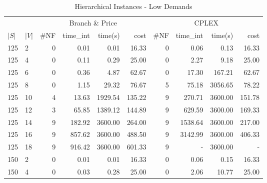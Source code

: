 \begin{appendices}
\begin{table*}
\scriptsize
\begin{center}
\caption{Hierarchical Instances - Low Demands}
\begin{tabular} {l l | r r r r | r r r r}
\hline
       &                                 &  \multicolumn{4}{c|}{Branch \& Price}                                & \multicolumn{4}{c}{CPLEX}                 \\
 $|S|$ & $|V|$                           &  \#NF  & time\_int     &  time(s)      &  cost            &  \#NF   &  time\_int   &  time(s)       &  cost       \\ 
\hline
125 & 2   &  0            &  0.01          &  0.01        &  16.33     &  0           &  0.06            &  0.13       &  16.33     \\ 
125 & 4   &  0            &  0.11          &  0.29        &  25.00     &  0           &  2.27            &  9.18       &  25.00     \\ 
125 & 6   &  0            &  0.36          &  4.87        &  62.67     &  0           &  17.30           &  167.21     &  62.67     \\ 
125 & 8   &  0            &  1.15          &  29.32       &  76.67     &  5           &  75.18           &  3056.65    &  78.22     \\ 
125 & 10  &  4            &  13.63         &  1929.54     &  135.22    &  9           &  270.71          &  3600.00    &  151.78    \\ 
125 & 12  &  3            &  65.85         &  1389.12     &  144.89    &  9           &  629.59          &  3600.00    &  169.33    \\ 
125 & 14  &  9            &  182.92        &  3600.00     &  264.00    &  9           &  1538.64         &  3600.00    &  217.00    \\ 
125 & 16  &  9            &  857.62        &  3600.00     &  488.50    &  9           &  3142.99         &  3600.00    &  406.33    \\ 
125 & 18  &  9            &  916.42        &  3600.00     &  601.33    &  9           &  -               &  3600.00    &  -         \\ 
150 & 2   &  0            &  0.01          &  0.01        &  16.33     &  0           &  0.06            &  0.15       &  16.33     \\ 
150 & 4   &  0            &  0.03          &  0.28        &  25.00     &  0           &  2.06            &  10.77      &  25.00     \\ 

\end{tabular}
\end{center}
\end{table*}
\end{appendices}
